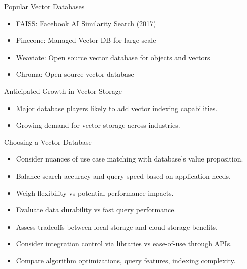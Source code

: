 \begin{frame}[fragile]{Popular Vector Databases}
  \begin{itemize}
    \item FAISS: Facebook AI Similarity Search (2017)
    \item Pinecone: Managed Vector DB for large scale
    \item Weaviate: Open source vector database for objects and vectors
    \item Chroma: Open source vector database
  \end{itemize}
\end{frame}

\begin{frame}[fragile]{Anticipated Growth in Vector Storage}
  \begin{itemize}
    \item Major database players likely to add vector indexing capabilities.
    \item Growing demand for vector storage across industries.
  \end{itemize}
\end{frame}

\begin{frame}[fragile]{Choosing a Vector Database}
  \begin{itemize}
    \item Consider nuances of use case matching with database's value proposition.
    \item Balance search accuracy and query speed based on application needs.
    \item Weigh flexibility vs potential performance impacts.
    \item Evaluate data durability vs fast query performance.
    \item Assess tradeoffs between local storage and cloud storage benefits.
    \item Consider integration control via libraries vs ease-of-use through APIs.
    \item Compare algorithm optimizations, query features, indexing complexity.
  \end{itemize}
\end{frame}

